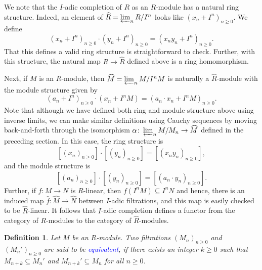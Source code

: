 \documentclass[11pt]{article}
\theoremstyle{thmstyle}
\theoremstyle{defstyle}
\newtheorem{definition}[theorem]{Definition}
\newcommand{\wh}[1]{\widehat{#1}}
\newcommand{\define}[1]{\textcolor{blue}{\textit{#1}}}
\renewcommand{\ge}{\geqslant}
\begin{document}
We note that the $I$-adic completion of $R$ as an $R$-module has a natural ring structure. Indeed, an element of $\wh R = \varprojlim_n R/I^n$ looks like $(x_n + I^n)_{n\ge 0}$. We define 
\begin{equation*}
    \left(x_n + I^n\right)_{n\ge 0}\cdot\left(y_n + I^n\right)_{n\ge 0} = \left(x_ny_n + I^n\right)_{n\ge 0}.
\end{equation*}
That this defines a valid ring structure is straightforward to check. Further, with this structure, the natural map $R\to \wh R$ defined above is a ring homomorphism.

Next, if $M$ is an $R$-module, then $\wh M = \varprojlim_n M/I^n M$ is naturally a $\wh R$-module with the module structure given by 
\begin{equation*}
    \left(a_n + I^n\right)_{n\ge 0}\cdot\left(x_n + I^n M\right) = \left(a_n\cdot x_n + I^nM\right)_{n\ge 0}.
\end{equation*}
Note that although we have defined both ring and module structure above using inverse limits, we can make similar definitions using Cauchy sequences by moving back-and-forth through the isomorphism $\alpha\colon\varprojlim_n M/M_n\to\wh M$ defined in the preceding section. In this case, the ring structure is 
\begin{equation*}
    \left[(x_n)_{n\ge 0}\right]\cdot\left[(y_n)_{n\ge 0}\right] = \left[(x_ny_n)_{n\ge 0}\right],
\end{equation*}
and the module structure is 
\begin{equation*}
    \left[(a_n)_{n\ge 0}\right]\cdot\left[(y_n)_{n\ge 0}\right] = \left[(a_n\cdot y_n)_{n\ge 0}\right].
\end{equation*}
Further, if $f\colon M\to N$ is $R$-linear, then $f(I^nM)\subseteq I^n N$ and hence, there is an induced map $\wh f\colon\wh M\to\wh N$ between $I$-adic filtrations, and this map is easily checked to be $\wh R$-linear. It follows that $I$-adic completion defines a functor from the category of $R$-modules to the category of $\wh R$-modules.

\begin{definition}
    Let $M$ be an $R$-module. Two filtrations $(M_n)_{n\ge 0}$ and $(M_n')_{n\ge 0}$ are said to be \define{equivalent}, if there exists an integer $k\ge 0$ such that $M_{n + k}\subseteq M_n'$ and $M_{n + k}'\subseteq M_n$ for all $n\ge 0$.
\end{definition}
\end{document}
